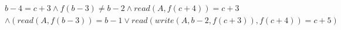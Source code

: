 \begin{align*}
%
& %
b - 4 = c + 3
%
\land
%
f(b - 3)  \neq  b - 2
%
\land
%
\mathit{read}(A,f(c + 4)) = c + 3
~\\~
& %
%
\land
%
(\mathit{read}(A,f(b - 3)) = b - 1 \lor \mathit{read}(\mathit{write}(A,b - 2,f(c + 3)),f(c + 4)) = c + 5)
%
\end{align*}
